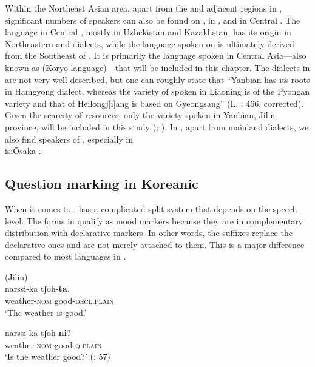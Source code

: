 Within the Northeast Asian area, apart from the  and adjacent regions in , significant numbers of  speakers can also be found on , in , and in Central . The language in Central , mostly in Uzbekistan and Kazakhstan, has its origin in Northeastern and  dialects, while the language spoken on  is ultimately derived from the Southeast of  \citep[128]{King2006a}. It is primarily the language spoken in Central Asia---also known as  (Koryo language)---that will be included in this chapter. The  dialects in  are not very well described, but one can roughly state that “Yanbian  has its roots in Hamgyong dialect, whereas the variety of  spoken in Liaoning is of the Pyongan variety and that of Heilongj[i]ang is based on Gyeongsang” (L. \citealt{BrownYeon2015}: 466, corrected). Given the scarcity of resources, only the variety spoken in Yanbian, Jilin province, will be included in this study (\citealt{ZhaoXi1982}; \citealt{XuanDewu1985}). In , apart from mainland  dialects, we also find speakers of , especially in \\isi{\=Osaka} \citep{Saltzman2014}.

\subsection{Question marking in Koreanic}\label{sec:5.7.2}

When it comes to ,  has a complicated split system that depends on the speech level. The  forms in  qualify as  mood markers because they are in complementary distribution with declarative markers. In other words, the  suffixes replace the declarative ones and are not merely attached to them. This is a major difference compared to most languages in .

\ea%
    \label{ex:kore:2}
     (Jilin)\\
    \ea
    \gll narssi-ka  tʃoh-\textbf{{ta}}.\\
    weather-\textsc{nom}  good-\textsc{decl.plain}\\
    \glt ‘The weather is good.’
    
    \ex
    \gll narssi-ka  tʃoh-\textbf{{ni}}?\\
    weather-\textsc{nom}  good-\textsc{q.plain}\\
    \glt ‘Is the weather good?’ (\citealt{XuanDewu1985}: 57)
    \z
    \z

